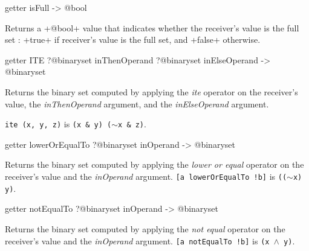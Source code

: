 \begin{galgas4box}
getter isFull -> @bool
\end{galgas4box}

Returns a \ggsq+@bool+ value that indicates whether the receiver's value is the full set : \ggsq+true+ if receiver's value is the full set, and \ggsq+false+ otherwise.








\begin{galgas4box}
getter ITE ?@binaryset inThenOperand ?@binaryset inElseOperand -> @binaryset
\end{galgas4box}


Returns the binary set computed by applying the \emph{ite} operator on the receiver's value, the \emph{inThenOperand} argument, and the  \emph{inElseOperand} argument.

{\texttt{ite (x, y, z)} is \texttt{(x \& y) \textbar ($\sim$x \& z)}.}








\begin{galgas4box}
getter lowerOrEqualTo ?@binaryset inOperand -> @binaryset
\end{galgas4box}


Returns the binary set computed by applying the \emph{lower or equal} operator on the receiver's value and the \emph{inOperand} argument.
{\texttt{[a lowerOrEqualTo !b]} is \texttt{(($\sim$x) \textbar y)}.}








\begin{galgas4box}
getter notEqualTo ?@binaryset inOperand -> @binaryset
\end{galgas4box}


Returns the binary set computed by applying the \emph{not equal} operator on the receiver's value and the \emph{inOperand} argument.
{\texttt{[a notEqualTo !b]} is \texttt{(x $\wedge$ y)}.}








